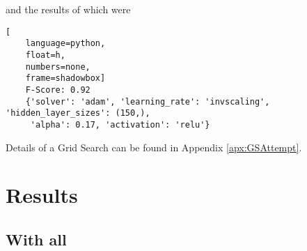\documentclass{UoNMCHA}
\newcommand{\inlineQuote}[1]{``#1''}
\numberwithin{equation}{section}
\begin{document}
and the results of which were

\begin{lstlisting}[
    language=python,
    float=h,
    numbers=none,
    frame=shadowbox]
    F-Score: 0.92
    {'solver': 'adam', 'learning_rate': 'invscaling', 'hidden_layer_sizes': (150,),
     'alpha': 0.17, 'activation': 'relu'}
\end{lstlisting}

Details of a Grid Search can be found in Appendix \ref{apx:GSAttempt}.









\section{Results}

\subsection{With all}
\end{document}
